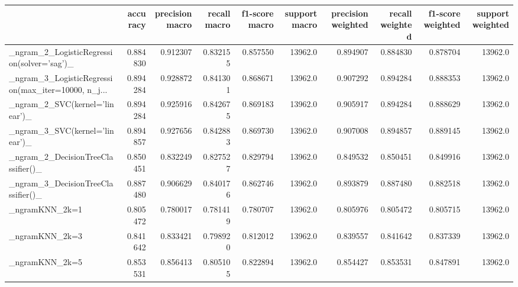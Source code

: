 \begin{tabular}{lrrrrrrrrr}
\toprule
{} &  accuracy &  precision macro &  recall macro &  f1-score macro &  support macro &  precision weighted &  recall weighted &  f1-score weighted &  support weighted \\
\midrule
\_ngram\_2\_LogisticRegression(solver='sag')\_         &  0.884830 &         0.912307 &      0.832155 &        0.857550 &        13962.0 &            0.894907 &         0.884830 &           0.878704 &           13962.0 \\
\_ngram\_3\_LogisticRegression(max\_iter=10000, n\_j... &  0.894284 &         0.928872 &      0.841301 &        0.868671 &        13962.0 &            0.907292 &         0.894284 &           0.888353 &           13962.0 \\
\_ngram\_2\_SVC(kernel='linear')\_                     &  0.894284 &         0.925916 &      0.842675 &        0.869183 &        13962.0 &            0.905917 &         0.894284 &           0.888629 &           13962.0 \\
\_ngram\_3\_SVC(kernel='linear')\_                     &  0.894857 &         0.927656 &      0.842883 &        0.869730 &        13962.0 &            0.907008 &         0.894857 &           0.889145 &           13962.0 \\
\_ngram\_2\_DecisionTreeClassifier()\_                 &  0.850451 &         0.832249 &      0.827527 &        0.829794 &        13962.0 &            0.849532 &         0.850451 &           0.849916 &           13962.0 \\
\_ngram\_3\_DecisionTreeClassifier()\_                 &  0.887480 &         0.906629 &      0.840176 &        0.862746 &        13962.0 &            0.893879 &         0.887480 &           0.882518 &           13962.0 \\
\_ngramKNN\_2k=1                                     &  0.805472 &         0.780017 &      0.781419 &        0.780707 &        13962.0 &            0.805976 &         0.805472 &           0.805715 &           13962.0 \\
\_ngramKNN\_2k=3                                     &  0.841642 &         0.833421 &      0.798920 &        0.812012 &        13962.0 &            0.839557 &         0.841642 &           0.837339 &           13962.0 \\
\_ngramKNN\_2k=5                                     &  0.853531 &         0.856413 &      0.805105 &        0.822894 &        13962.0 &            0.854427 &         0.853531 &           0.847891 &           13962.0 \\

\end{tabular}
